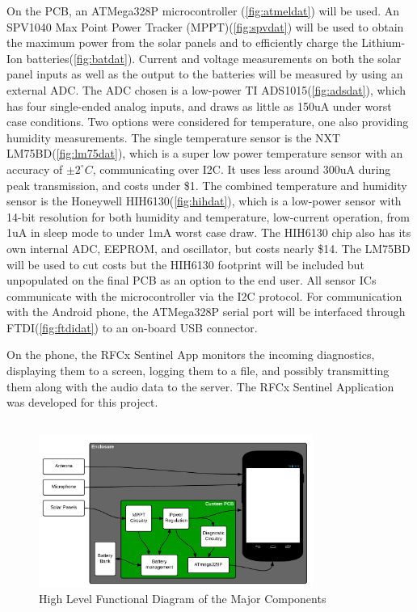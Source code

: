 \documentclass{article}
\begin{document}
{\bigskip
On the PCB, an ATMega328P microcontroller (\ref{fig:atmeldat}) will be used. An SPV1040 Max Point Power Tracker (MPPT)(\ref{fig:spvdat}) will be used to obtain the maximum power from the solar panels and to efficiently charge the Lithium-Ion batteries(\ref{fig:batdat}). Current and voltage measurements on both the solar panel inputs as well as the output to the batteries will be measured by using an external ADC. The ADC chosen is a low-power TI ADS1015(\ref{fig:adsdat}), which has four single-ended analog inputs, and draws as little as 150uA under worst case conditions. Two options were considered for temperature, one also providing humidity measurements. The single temperature sensor is the NXT LM75BD(\ref{fig:lm75dat}), which is a super low power temperature sensor with an accuracy of $\pm2^{\circ}C$, communicating over I2C. It uses less around 300uA during peak transmission, and costs under \$1. The combined temperature and humidity sensor is the Honeywell HIH6130(\ref{fig:hihdat}), which is a low-power sensor with 14-bit resolution for both humidity and temperature, low-current operation, from 1uA in sleep mode to under 1mA worst case draw. The HIH6130 chip also has its own internal ADC, EEPROM, and oscillator, but costs nearly \$14. The LM75BD will be used to cut costs but the HIH6130 footprint will be included but unpopulated on the final PCB as an option to the end user.  All sensor ICs communicate with the microcontroller via the I2C protocol. For communication with the Android phone, the ATMega328P serial port will be interfaced through FTDI(\ref{fig:ftdidat}) to an on-board USB connector.

On the phone, the RFCx Sentinel App monitors the incoming diagnostics, displaying them to a screen, logging them to a file, and possibly transmitting them along with the audio data to the server. The RFCx Sentinel Application was developed for this project. 

\subsection{}

\begin{figure}[H]
  \centering
  \includegraphics[width=0.8\textwidth]{Highlevel}
  \caption{High Level Functional Diagram of the Major Components}
  \label{fig:hldia}
\end{figure}

}
\end{document}
